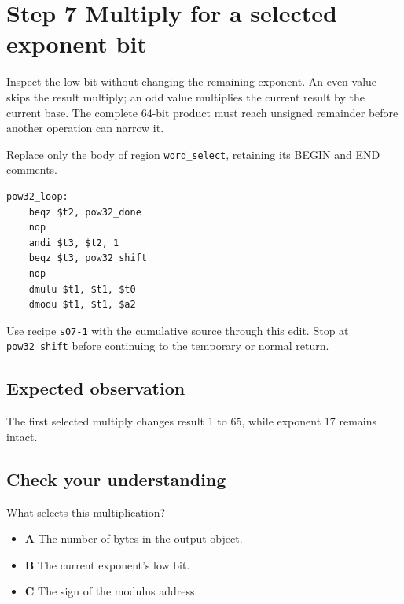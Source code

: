 \section{Step 7 Multiply for a selected exponent bit}\label{rsa-s07}

Inspect the low bit without changing the remaining exponent. An even value skips the result multiply; an odd value multiplies the current result by the current base. The complete 64-bit product must reach unsigned remainder before another operation can narrow it.

Replace only the body of region \texttt{word\_select}, retaining its BEGIN and END comments.

\begin{verbatim}
pow32_loop:
    beqz $t2, pow32_done
    nop
    andi $t3, $t2, 1
    beqz $t3, pow32_shift
    nop
    dmulu $t1, $t1, $t0
    dmodu $t1, $t1, $a2
\end{verbatim}

Use recipe \texttt{s07-1} with the cumulative source through this edit. Stop at \texttt{pow32\_shift} before continuing to the temporary or normal return.

\subsection{Expected observation}
The first selected multiply changes result 1 to 65, while exponent 17 remains intact.

\subsection{Check your understanding}
What selects this multiplication?

\begin{itemize}
\item \textbf{A} The number of bytes in the output object.
\item \textbf{B} The current exponent's low bit.
\item \textbf{C} The sign of the modulus address.
\end{itemize}
